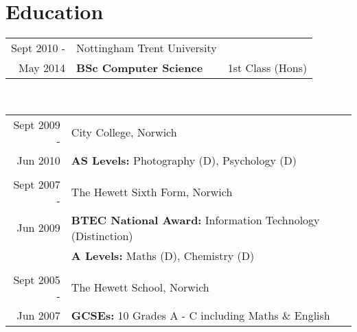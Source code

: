 \documentclass[a4paper,10pt]{article} %
\begin{document}
\section{Education}
\begin{tabular}{r|ll}
Sept 2010 -& Nottingham Trent University & \\
May 2014& \textbf{BSc Computer Science} & 1st Class (Hons) \\
\end{tabular} \\
\begin{tabular}{r|l}
Sept 2009 -& City College, Norwich \\
Jun 2010 & \textbf{AS Levels: }Photography (D), Psychology (D) \\
\multicolumn{2}{c}{} \\
Sept 2007 -& The Hewett Sixth Form, Norwich \\
Jun 2009 & \textbf{BTEC National Award: }Information Technology (Distinction) \\
& \textbf{A Levels: }Maths (D), Chemistry (D) \\
\multicolumn{2}{c}{} \\
Sept 2005 -& The Hewett School, Norwich \\
Jun 2007 & \textbf{GCSEs: }10 Grades A - C including Maths \& English \\
\end{tabular}
\end{document}
